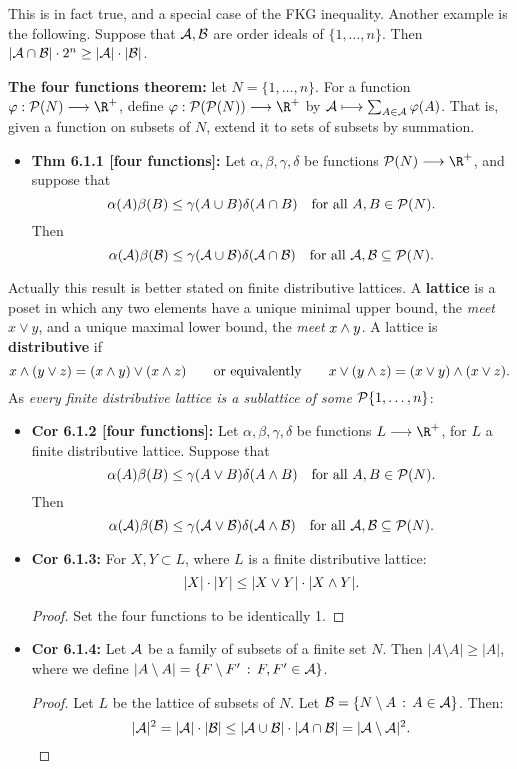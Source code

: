 \documentclass[11pt]{article}
\newenvironment{INT}[1][]{\begin{itemize}\small\item\textbf{#1}}{\end{itemize}}
\newcommand{\moreINT}[1][]{\item\textbf{#1}}
\begin{document}
\begin{chapter6}
\begin{itemise}
\INDENT This is in fact true, and a special case of the FKG inequality. Another example is the following. Suppose that $\mathcal{A},\mathcal{B}$ are order ideals of $\{1,\ldots,n\}$. Then $|\mathcal{A}\cap \mathcal{B}|\cdot2^n\geq|\mathcal{A}|\cdot |\mathcal{B}|$.
\item \textbf{The four functions theorem:} let $N=\{1,\ldots,n\}$. For a function $\phi:\calP(N)\to\R^+$, define $\phi:\calP(\calP(N))\to\R^+$ by $\mathcal{A}\longmapsto\sum_{A\in\mathcal{A}}\varphi(A)$. That is, given a function on subsets of $N$, extend it to sets of subsets by summation.
\begin{INT}[Thm 6.1.1 {[four functions]}:] Let $\alpha,\beta,\gamma,\delta$ be functions $\calP(N)\to\R^+$, and suppose that
\[\alpha(A)\beta(B)\leq\gamma(A\cup B)\delta(A\cap B)\textup{\quad for all $A,B\in\mathcal{P}(N)$}.\]
Then
\[\alpha(\mathcal{A})\beta(\mathcal{B})\leq\gamma(\mathcal{A}\cup \mathcal{B})\delta(\mathcal{A}\cap \mathcal{B})\textup{\quad for all $\mathcal{A},\mathcal{B}\subseteq\mathcal{P}(N)$}.\]
\end{INT}
Actually this result is better stated on finite distributive lattices. A \textbf{lattice} is a poset in which any two elements have a unique minimal upper bound, the \emph{meet} $x\vee y$, and a unique maximal lower bound, the \emph{meet} $x\wedge y$. A lattice is \textbf{distributive} if 
\[x\wedge(y\vee z)=(x\wedge y)\vee (x\wedge z)\textup{\qquad or equivalently\qquad }x\vee(y\wedge z)=(x\vee y)\wedge (x\vee z).\]
As \emph{every finite distributive lattice is a sublattice of some $\mathcal{P}\{1,\ldots,n\}$}:
\begin{INT}[Cor 6.1.2 {[four functions]}:] Let $\alpha,\beta,\gamma,\delta$ be functions $L\to\R^+$, for $L$ a finite distributive lattice. Suppose that
\[\alpha(A)\beta(B)\leq\gamma(A\vee B)\delta(A\wedge B)\textup{\quad for all $A,B\in\mathcal{P}(N)$}.\]
Then
\[\alpha(\mathcal{A})\beta(\mathcal{B})\leq\gamma(\mathcal{A}\vee \mathcal{B})\delta(\mathcal{A}\wedge \mathcal{B})\textup{\quad for all $\mathcal{A},\mathcal{B}\subseteq\mathcal{P}(N)$}.\]
\moreINT[Cor 6.1.3:] For $X,Y\subset L$, where $L$ is a finite distributive lattice:
\[|X|\cdot|Y|\leq|X\vee Y|\cdot|X\wedge Y|.\]
\begin{proof}
Set the four functions to be identically 1.
\end{proof}
\moreINT[Cor 6.1.4:]
Let $\mathcal{A}$ be a family of subsets of a finite set $N$. Then $|A\setminus A|\geq|A|$, where we define $|A\setminus A|=\{F\setminus F'\,:\, F,F'\in\mathcal{A}\}$.
\begin{proof}
Let $L$ be the lattice of subsets of $N$. Let $\mathcal{B}=\{N\setminus A\,:\, A\in\mathcal{A}\}$. Then:
\[|\mathcal{A}|^2=|\mathcal{A}|\cdot|\mathcal{B}|\leq|\mathcal{A}\cup\mathcal{B}|\cdot|\mathcal{A}\cap\mathcal{B}|=|\mathcal{A}\setminus\mathcal{A}|^2.\qedhere\]

\end{proof}
\end{INT}
\end{itemise}
\end{chapter6}
\end{document}
